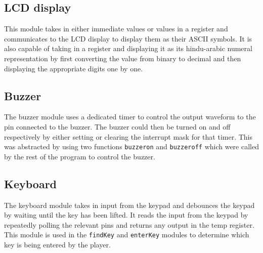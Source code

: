 \documentclass[a4paper]{article}
\begin{document}
\subsection{LCD display}
This module takes in either immediate values or values in a register and communicates to the LCD display to
display them as their ASCII symbols. It is also capable of taking in a register and displaying it as its
hindu-arabic numeral representation by first converting the value from binary to decimal and then displaying
the appropriate digits one by one.

\subsection{Buzzer}
The buzzer module uses a dedicated timer to control the output waveform to the pin connected to
the buzzer. The buzzer could then be turned on and off respectively by either setting or clearing the interrupt
mask for that timer. This was abstracted by using two functions \verb|buzzeron| and \verb|buzzeroff| which were
called by the rest of the program to control the buzzer.

\subsection{Keyboard}
The keyboard module takes in input from the keypad and debounces the keypad by waiting until the key has been
lifted. It reads the input from the keypad by repeatedly polling the relevant pins and returns any output 
in the temp register. This module is used in the \verb|findKey| and \verb|enterKey| modules to determine which 
key is being entered by the player.
\end{document}
